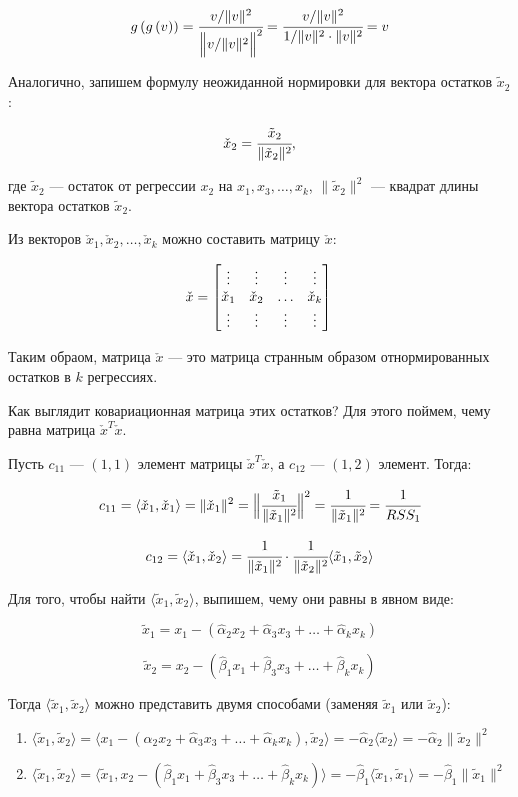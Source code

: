 \documentclass[12pt]{article} %
\theoremstyle{definition} %
\def \hb{\hat{\beta}}
\def \ha{\hat{\alpha}}
\def \tx{\tilde{x}}
\def \cx{\check{x}}
\begin{document}
\[
g \left(g \left(v \right) \right) = 
\cfrac
    {v / \lVert v \rVert^2}
    {\Big\lVert v / \lVert v \rVert^2 \Big\rVert^2} 
= \cfrac
    {v / \lVert v \rVert^2}
    {1 / \lVert v \rVert^2 \cdot \lVert v \rVert^2}
= v
\]

Аналогично, запишем формулу неожиданной нормировки для вектора остатков $\tx_2$:

\[
\cx_2 = \cfrac{\tx_2}{\lVert \tx_2 \rVert^2},
\]

где $\tx_2$ — остаток от регрессии $x_2$ на $x_1, x_3, \dots, x_k$, $\| \tx_2 \|^2$ — квадрат длины вектора остатков $\tx_2$.

Из векторов $\cx_1, \cx_2, \dots, \cx_k$ можно составить матрицу $\cx$:

\[
\cx = 
        \begin{bmatrix}
           \vdots & \vdots & \vdots & \vdots \\
           \cx_1 & \cx_2 & \dots & \cx_k  \\
           \vdots & \vdots & \vdots & \vdots \\
         \end{bmatrix} \\
\]

Таким обраом, матрица $\cx$ — это матрица странным образом отнормированных остатков в $k$ регрессиях.

Как выглядит ковариационная матрица этих остатков? Для этого поймем, чему равна матрица $\cx^T \cx$. 

Пусть $c_{11}$ —  $(1, 1)$ элемент матрицы $\cx^T \cx$, а $c_{12}$ — $(1,2)$ элемент. Тогда:

\[ 
c_{11} = \langle \cx_1, \cx_1 \rangle = \lVert \cx_1 \rVert^2 = \Big\lVert \cfrac{\tx_1}{\lVert \tx_1 \rVert^2}  \Big\rVert^2 = \cfrac{1}{\lVert \tx_1 \rVert^2} = \cfrac{1}{RSS_1} 
\] 

\[
 c_{12} = \langle \cx_1, \cx_2 \rangle = \cfrac{1}{\lVert \tx_1 \rVert^2} \cdot \cfrac{1}{\lVert \tx_2 \rVert^2} \langle \tx_1, \tx_2 \rangle
\] 

Для того, чтобы найти $\langle \tx_1, \tx_2 \rangle $, выпишем, чему они равны в явном виде:

\[ 
\tx_1 = x_1 - (\ha_2 x_2 + \ha_3 x_3 + \ldots + \ha_k x_k) 
\]

\[ 
\tx_2 = x_2 - (\hb_1 x_1 + \hb_3 x_3 + \ldots + \hb_k x_k) 
\]

Тогда $\langle \tx_1, \tx_2 \rangle $ можно представить двумя способами (заменяя $\tx_1$ или $\tx_2$):

\begin{enumerate}

\item $ \langle \tx_1, \tx_2 \rangle = \langle x_1 - (\ha_2 x_2 + \ha_3 x_3 + \ldots + \ha_k x_k) , \tx_2  \rangle = -\ha_2 \langle \tx_2 \rangle = -\ha_2 \lVert \tx_2 \rVert^2 $

\item $ \langle \tx_1, \tx_2 \rangle = \langle \tx_1, x_2 - (\hb_1 x_1 + \hb_3 x_3 + \ldots + \hb_k x_k) \rangle =  -\hb_1 \langle \tx_1 , \tx_1 \rangle =  -\hb_1 \lVert \tx_1 \rVert^2 $

\end{enumerate}
\end{document}
